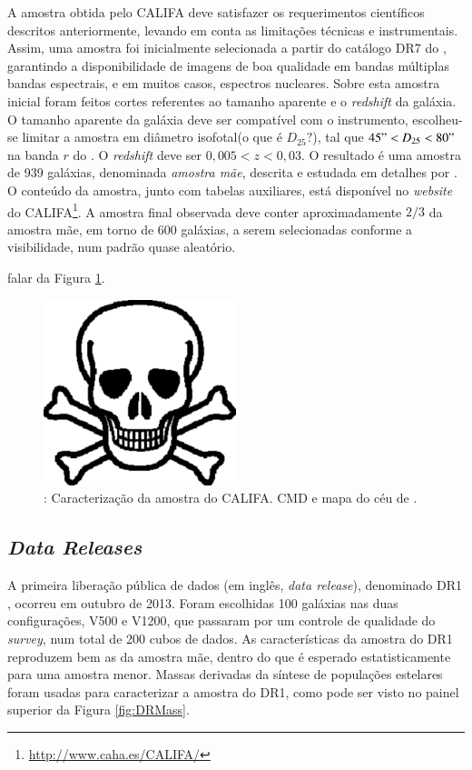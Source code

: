 A amostra obtida pelo CALIFA deve satisfazer os requerimentos científicos
descritos anteriormente, levando em conta as limitações técnicas e
instrumentais. Assim, uma amostra foi inicialmente selecionada a partir do
catálogo DR7 do \SDSS \citep{Abazajian2009}, garantindo a disponibilidade de
imagens de boa qualidade em bandas múltiplas bandas espectrais, e em muitos
casos, espectros nucleares. Sobre esta amostra inicial foram feitos cortes
referentes ao tamanho aparente e o {\em redshift} da galáxia. O tamanho aparente
da galáxia deve ser compatível com o instrumento, escolheu-se limitar a amostra
em diâmetro isofotal\fixme(o que é $D_{25}?$), tal que $45" < D_{25} < 80"$ na
banda $r$ do \SDSS. O {\em redshift} deve ser $0,005 < z < 0,03$. O resultado é
uma amostra de 939 galáxias, denominada {\em amostra mãe}, descrita e estudada
em detalhes por \citet{Walcher2014}. O conteúdo da amostra, junto com tabelas
auxiliares, está disponível no {\em website} do
CALIFA\footnote{\url{http://www.caha.es/CALIFA/}}. A amostra final observada
deve conter aproximadamente $2/3$ da amostra mãe, em torno de 600 galáxias, a
serem selecionadas conforme a visibilidade, num padrão quase aleatório.

\TODO falar da Figura \ref{fig:CALIFASample}.

\begin{figure}
	\includegraphics[width=0.5\textwidth]{figuras/test.pdf}
	\caption[Caracterização da amostra do CALIFA.]
	{\TODO: Caracterização da amostra do CALIFA. CMD e mapa do céu de
	\citet{Sanchez2012}.}
	\label{fig:CALIFASample}
\end{figure}

\subsection{{\em Data Releases}}

A primeira liberação pública de dados (em inglês, {\em data release}),
denominado DR1 \citep{Husemann2013}, ocorreu em outubro de 2013\fixme. Foram
escolhidas 100 galáxias nas duas configurações, V500 e V1200, que passaram por
um controle de qualidade do {\em survey}, num total de 200 cubos de dados. As
características da amostra do DR1 reproduzem bem as da amostra mãe, dentro do
que é esperado estatisticamente para uma amostra menor. Massas derivadas da
síntese de populações estelares foram usadas para caracterizar a amostra do DR1,
como pode ser visto no painel superior da Figura \ref{fig:DRMass}.

